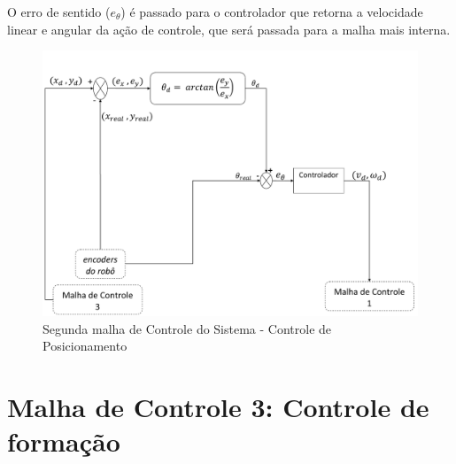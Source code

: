 O erro de sentido (\emph{$e_{\theta}$}) é passado para o controlador que retorna a velocidade linear e angular da ação de controle, que será passada para a malha mais interna. %



\begin{figure}[!htb]
	\centering
	\includegraphics[width=1.0\textwidth]{./04-figuras/malha2}
	\caption{Segunda malha de Controle do Sistema - Controle de Posicionamento}
	\label{fig:malha2}
\end{figure}

\section{Malha de Controle 3: Controle de formação}
\label{sec:malha3 }











